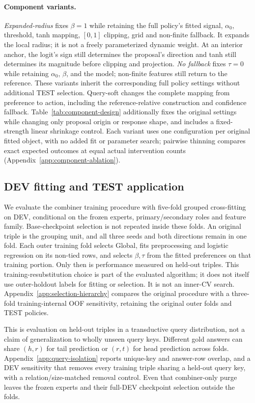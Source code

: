 \documentclass[11pt,a4paper]{article}
\begin{document}
\paragraph{Component variants.}
\emph{Expanded-radius} fixes $\beta=1$ while retaining the full policy's fitted signal, $\alpha_0$, threshold, tanh mapping, $[0,1]$ clipping, grid and non-finite fallback. It expands the local radius; it is not a freely parameterized dynamic weight. At an interior anchor, the logit's sign still determines the proposal's direction and tanh still determines its magnitude before clipping and projection. \emph{No fallback} fixes $\tau=0$ while retaining $\alpha_0$, $\beta$, and the model; non-finite features still return to the reference. These variants inherit the corresponding full policy settings without additional TEST selection. Query-soft changes the complete mapping from preference to action, including the reference-relative construction and confidence fallback. Table~\ref{tab:component-design} additionally fixes the original settings while changing only proposal origin or response shape, and includes a fixed-strength linear shrinkage control. Each variant uses one configuration per original fitted object, with no added fit or parameter search; pairwise thinning compares exact expected outcomes at equal actual intervention counts (Appendix~\ref{app:component-ablation}).

\subsection{DEV fitting and TEST application}
We evaluate the combiner training procedure with five-fold grouped cross-fitting on DEV, conditional on the frozen experts, primary/secondary roles and feature family. Base-checkpoint selection is not repeated inside these folds. An original triple is the grouping unit, and all three seeds and both directions remain in one fold. Each outer training fold selects Global, fits preprocessing and logistic regression on its non-tied rows, and selects $\beta,\tau$ from the fitted preferences on that training portion. Only then is performance measured on held-out triples. This training-resubstitution choice is part of the evaluated algorithm; it does not itself use outer-holdout labels for fitting or selection. It is not an inner-CV search. Appendix~\ref{app:selection-hierarchy} compares the original procedure with a three-fold training-internal OOF sensitivity, retaining the original outer folds and TEST policies.

This is evaluation on held-out triples in a transductive query distribution, not a claim of generalization to wholly unseen query keys. Different gold answers can share $(h,r)$ for tail prediction or $(r,t)$ for head prediction across folds. Appendix~\ref{app:query-isolation} reports unique-key and answer-row overlap, and a DEV sensitivity that removes every training triple sharing a held-out query key, with a relation/size-matched removal control. Even that combiner-only purge leaves the frozen experts and their full-DEV checkpoint selection outside the folds.
\end{document}
